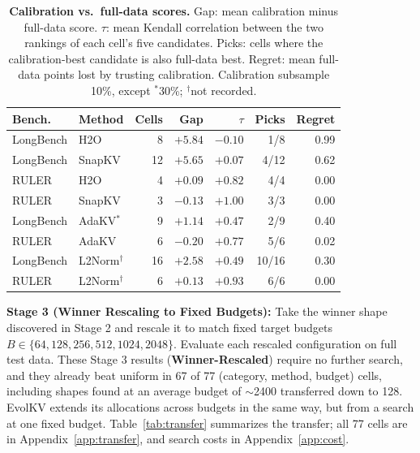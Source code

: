 \documentclass[11pt]{article}
\begin{document}
\begin{table}[htbp]
  \centering
  \footnotesize
  \setlength{\tabcolsep}{2.5pt}
  \begin{tabular}{@{} l l r r r r r @{}}
    \toprule
    \textbf{Bench.} & \textbf{Method} & \textbf{Cells} & \textbf{Gap} & \textbf{$\tau$} & \textbf{Picks} & \textbf{Regret} \\
    \midrule
    \rowcolor{gray!10}
    LongBench & H2O    & 8  & $+5.84$ & $-0.10$ & 1/8  & 0.99 \\
    LongBench & SnapKV & 12 & $+5.65$ & $+0.07$ & 4/12 & 0.62 \\
    \rowcolor{gray!10}
    RULER     & H2O    & 4  & $+0.09$ & $+0.82$ & 4/4  & 0.00 \\
    RULER     & SnapKV & 3  & $-0.13$ & $+1.00$ & 3/3  & 0.00 \\
    \midrule
    \rowcolor{gray!10}
    LongBench & AdaKV$^\ast$ & 9 & $+1.14$ & $+0.47$ & 2/9 & 0.40 \\
    RULER     & AdaKV  & 6  & $-0.20$ & $+0.77$ & 5/6  & 0.02 \\
    \midrule
    \rowcolor{gray!10}
    LongBench & L2Norm$^\dagger$ & 16 & $+2.58$ & $+0.49$ & 10/16 & 0.30 \\
    RULER     & L2Norm$^\dagger$ & 6  & $+0.13$ & $+0.93$ & 6/6   & 0.00 \\
    \bottomrule
  \end{tabular}
  \caption{\textbf{Calibration vs.\ full-data scores.} Gap: mean calibration minus full-data score. $\tau$: mean Kendall correlation between the two rankings of each cell's five candidates. Picks: cells where the calibration-best candidate is also full-data best. Regret: mean full-data points lost by trusting calibration. Calibration subsample 10\%, except $^\ast$30\%; $^\dagger$not recorded.}
  \label{tab:calib}
\end{table}

\textbf{Stage 3 (Winner Rescaling to Fixed Budgets):} Take the winner shape discovered in Stage 2 and rescale it to match fixed target budgets $B \in \{64, 128, 256, 512, 1024, 2048\}$. Evaluate each rescaled configuration on full test data. These Stage 3 results (\textbf{Winner-Rescaled}) require no further search, and they already beat uniform in 67 of 77 (category, method, budget) cells, including shapes found at an average budget of $\sim$2400 transferred down to 128. EvolKV extends its allocations across budgets in the same way, but from a search at one fixed budget. Table~\ref{tab:transfer} summarizes the transfer; all 77 cells are in Appendix~\ref{app:transfer}, and search costs in Appendix~\ref{app:cost}.
\end{document}
